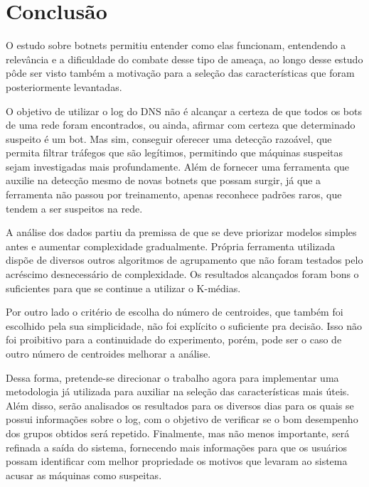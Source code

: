 \chapter{Conclusão}
O estudo sobre botnets permitiu entender como elas funcionam, entendendo a relevância e a dificuldade do combate desse tipo de ameaça, ao longo desse estudo pôde ser visto também a motivação para a seleção das características que foram posteriormente levantadas.

O objetivo de utilizar o log do DNS não é alcançar a certeza de que todos os bots de uma rede foram encontrados, ou ainda, afirmar com certeza que determinado suspeito é um bot. Mas sim, conseguir oferecer uma detecção razoável, que permita filtrar tráfegos que são legítimos, permitindo que máquinas suspeitas sejam investigadas mais profundamente. Além de fornecer uma ferramenta que auxilie na detecção mesmo de novas botnets que possam surgir, já que a ferramenta não passou por treinamento, apenas reconhece padrões raros, que tendem a ser suspeitos na rede.

A análise dos dados partiu da premissa de que se deve priorizar modelos simples antes e aumentar complexidade gradualmente. Própria ferramenta utilizada dispõe de diversos outros algoritmos de agrupamento que não foram testados pelo acréscimo desnecessário de complexidade. Os resultados alcançados foram bons o suficientes para que se continue a utilizar o K-médias.

Por outro lado o critério de escolha do número de centroides, que também foi escolhido pela sua simplicidade, não foi explícito o suficiente pra decisão. Isso não foi proibitivo para a continuidade do experimento, porém, pode ser o caso de outro número de centroides melhorar a análise.

Dessa forma, pretende-se direcionar o trabalho agora para implementar uma metodologia já utilizada para auxiliar na seleção das características mais úteis. Além disso, serão analisados os resultados para os diversos dias para os quais se possui informações sobre o log, com o objetivo de verificar se o bom desempenho dos grupos obtidos será repetido. Finalmente, mas não menos importante, será refinada a saída do sistema, fornecendo mais informações para que os usuários possam identificar com melhor propriedade os motivos que levaram ao sistema acusar as máquinas como suspeitas.